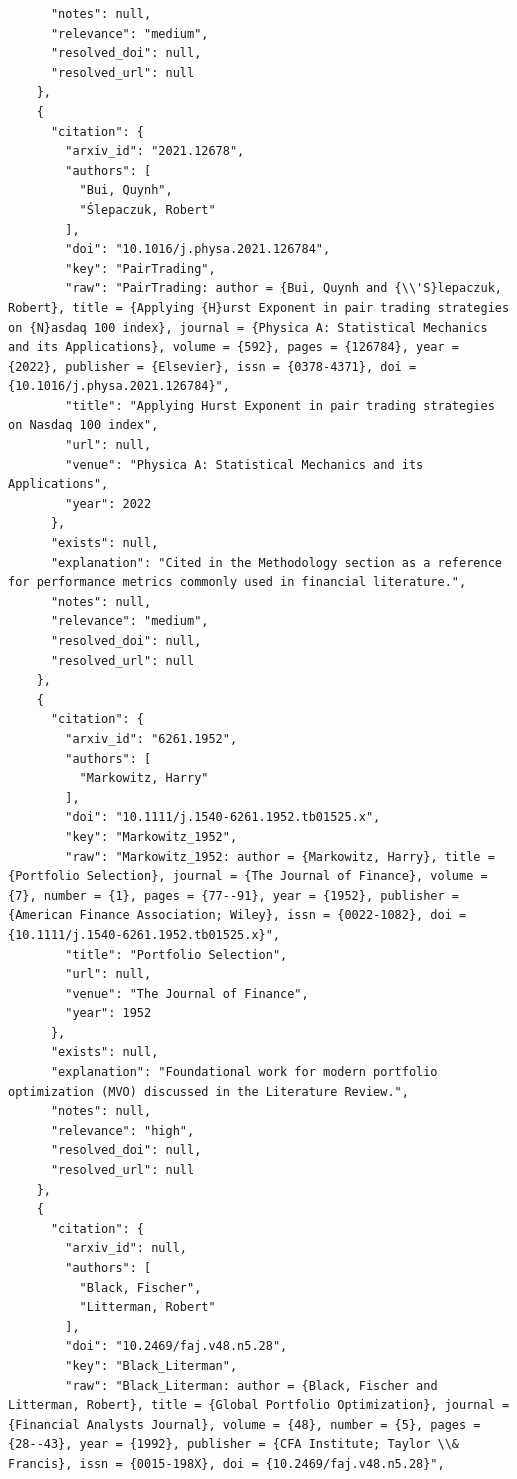 \documentclass[11pt]{article}
\begin{document}
\begin{verbatim}
      "notes": null,
      "relevance": "medium",
      "resolved_doi": null,
      "resolved_url": null
    },
    {
      "citation": {
        "arxiv_id": "2021.12678",
        "authors": [
          "Bui, Quynh",
          "Ślepaczuk, Robert"
        ],
        "doi": "10.1016/j.physa.2021.126784",
        "key": "PairTrading",
        "raw": "PairTrading: author = {Bui, Quynh and {\\'S}lepaczuk, Robert}, title = {Applying {H}urst Exponent in pair trading strategies on {N}asdaq 100 index}, journal = {Physica A: Statistical Mechanics and its Applications}, volume = {592}, pages = {126784}, year = {2022}, publisher = {Elsevier}, issn = {0378-4371}, doi = {10.1016/j.physa.2021.126784}",
        "title": "Applying Hurst Exponent in pair trading strategies on Nasdaq 100 index",
        "url": null,
        "venue": "Physica A: Statistical Mechanics and its Applications",
        "year": 2022
      },
      "exists": null,
      "explanation": "Cited in the Methodology section as a reference for performance metrics commonly used in financial literature.",
      "notes": null,
      "relevance": "medium",
      "resolved_doi": null,
      "resolved_url": null
    },
    {
      "citation": {
        "arxiv_id": "6261.1952",
        "authors": [
          "Markowitz, Harry"
        ],
        "doi": "10.1111/j.1540-6261.1952.tb01525.x",
        "key": "Markowitz_1952",
        "raw": "Markowitz_1952: author = {Markowitz, Harry}, title = {Portfolio Selection}, journal = {The Journal of Finance}, volume = {7}, number = {1}, pages = {77--91}, year = {1952}, publisher = {American Finance Association; Wiley}, issn = {0022-1082}, doi = {10.1111/j.1540-6261.1952.tb01525.x}",
        "title": "Portfolio Selection",
        "url": null,
        "venue": "The Journal of Finance",
        "year": 1952
      },
      "exists": null,
      "explanation": "Foundational work for modern portfolio optimization (MVO) discussed in the Literature Review.",
      "notes": null,
      "relevance": "high",
      "resolved_doi": null,
      "resolved_url": null
    },
    {
      "citation": {
        "arxiv_id": null,
        "authors": [
          "Black, Fischer",
          "Litterman, Robert"
        ],
        "doi": "10.2469/faj.v48.n5.28",
        "key": "Black_Literman",
        "raw": "Black_Literman: author = {Black, Fischer and Litterman, Robert}, title = {Global Portfolio Optimization}, journal = {Financial Analysts Journal}, volume = {48}, number = {5}, pages = {28--43}, year = {1992}, publisher = {CFA Institute; Taylor \\& Francis}, issn = {0015-198X}, doi = {10.2469/faj.v48.n5.28}",

\end{verbatim}
\end{document}
